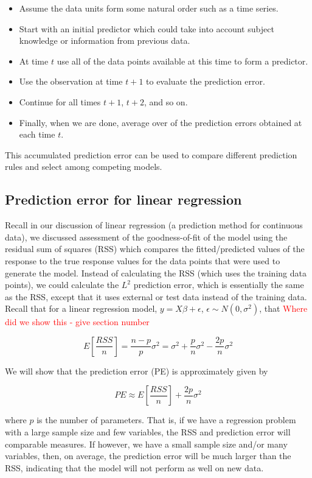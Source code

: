 \begin{itemize}
\item Assume the data units form some natural order such as a time series.
\item Start with an initial predictor which could take into account subject knowledge or information from previous data.
\item At time $t$ use all of the data points available at this time to form a predictor.
\item Use the observation at time $t + 1$ to evaluate the prediction error.
\item Continue for all times $t + 1$, $t + 2$, and so on.
\item Finally, when we are done, average over of the prediction errors obtained at each time $t$.
\end{itemize}



This accumulated prediction error can be used to compare different prediction rules and select among competing models.


\subsection*{Prediction error for linear regression}

Recall in our discussion of linear regression (a prediction method for continuous data), we discussed assessment of the goodness-of-fit of the model using the residual sum of squares (RSS) which compares the fitted/predicted values of the response to the true response values for the data points that were used to generate the model. Instead of calculating the RSS (which uses the training data points), we could calculate the $L^2$ prediction error, which is essentially the same as the RSS, except that it uses external or test data instead of the training data. Recall that for a linear regression model, $y = X\beta + \epsilon$, $\epsilon \sim N(0, \sigma^2)$, that \textcolor{red}{Where did we show this - give section number}

$$E\left[ \frac{RSS}{n} \right] = \frac{n - p}{p}\sigma^2 = \sigma^2 + \frac{p}{n} \sigma^2 - \frac{2p}{n}\sigma^2$$

We will show that the prediction error (PE) is approximately given by

$$PE \approx E\left[ \frac{RSS}{n} \right] + \frac{2p}{n} \sigma^2$$

where $p$ is the number of parameters. That is, if we have a regression problem with a large sample size and few variables, the RSS and prediction error will comparable measures. If however, we have a small sample size and/or many variables, then, on average, the prediction error will be much larger than the RSS, indicating that the model will not perform as well on new data. 

